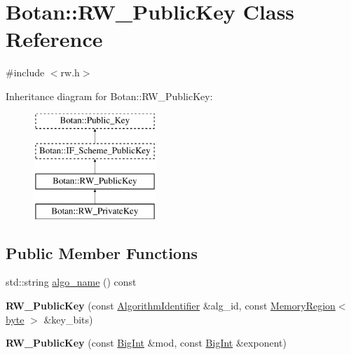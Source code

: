 \hypertarget{classBotan_1_1RW__PublicKey}{\section{Botan\-:\-:R\-W\-\_\-\-Public\-Key Class Reference}
\label{classBotan_1_1RW__PublicKey}
}


{\ttfamily \#include $<$rw.\-h$>$}

Inheritance diagram for Botan\-:\-:R\-W\-\_\-\-Public\-Key\-:\begin{figure}[H]
\begin{center}
\leavevmode
\includegraphics[height=4.000000cm]{classBotan_1_1RW__PublicKey}
\end{center}
\end{figure}
\subsection*{Public Member Functions}
\begin{DoxyCompactItemize}
\item 
std\-::string \hyperlink{classBotan_1_1RW__PublicKey_ae13fcd4516ef0cd6bb353d78b8b2530a}{algo\-\_\-name} () const 
\item 
\hypertarget{classBotan_1_1RW__PublicKey_a4ce062dea4032df5018345dab7ad7388}{{\bfseries R\-W\-\_\-\-Public\-Key} (const \hyperlink{classBotan_1_1AlgorithmIdentifier}{Algorithm\-Identifier} \&alg\-\_\-id, const \hyperlink{classBotan_1_1MemoryRegion}{Memory\-Region}$<$ \hyperlink{namespaceBotan_a7d793989d801281df48c6b19616b8b84}{byte} $>$ \&key\-\_\-bits)}\label{classBotan_1_1RW__PublicKey_a4ce062dea4032df5018345dab7ad7388}

\item 
\hypertarget{classBotan_1_1RW__PublicKey_a72fadc5862cc16f6e6f12c7f00876db5}{{\bfseries R\-W\-\_\-\-Public\-Key} (const \hyperlink{classBotan_1_1BigInt}{Big\-Int} \&mod, const \hyperlink{classBotan_1_1BigInt}{Big\-Int} \&exponent)}\label{classBotan_1_1RW__PublicKey_a72fadc5862cc16f6e6f12c7f00876db5}

\end{DoxyCompactItemize}

